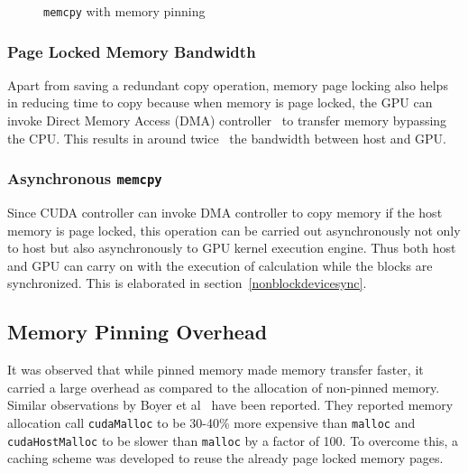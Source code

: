 \begin{figure}[h] %
  \caption{\texttt{memcpy} with memory pinning}\label{fig:w_mem_pin}
\end{figure}

\subsubsection{Page Locked Memory Bandwidth}
Apart from saving a redundant copy operation, memory page locking also helps in
reducing time to copy because when memory is page locked, the GPU can invoke Direct
Memory Access (DMA)
controller~\cite{dmatransfer}\cite{whypinnedfast}\cite{teslaspecs}\cite{teslakspecs}
to transfer memory bypassing the CPU. This results in around
twice~\cite{datatransferoptimization} the bandwidth between host and GPU.

\subsubsection{Asynchronous \texttt{memcpy}}
Since CUDA controller can invoke DMA controller to copy memory if the host memory
is page locked, this operation can be carried out asynchronously not only to host but
also asynchronously to GPU kernel execution engine. Thus both host and GPU can carry
on with the execution of calculation while the blocks are synchronized. This is
elaborated in section~\ref{nonblockdevicesync}.

\subsection{Memory Pinning Overhead}
It was observed that while pinned memory made memory transfer faster, it carried
a large overhead as compared to the allocation of non-pinned memory. Similar observations
by Boyer et al~\cite{Boyer2009}\cite{memory-management-overhead}\cite{pinned-tradeoff}
have been reported. They reported memory allocation call \texttt{cudaMalloc} to
be 30-40\% more expensive than \texttt{malloc} and \texttt{cudaHostMalloc} to be
slower than \texttt{malloc} by a factor of 100. To overcome this, a caching scheme was
developed to reuse the already page locked memory pages.

